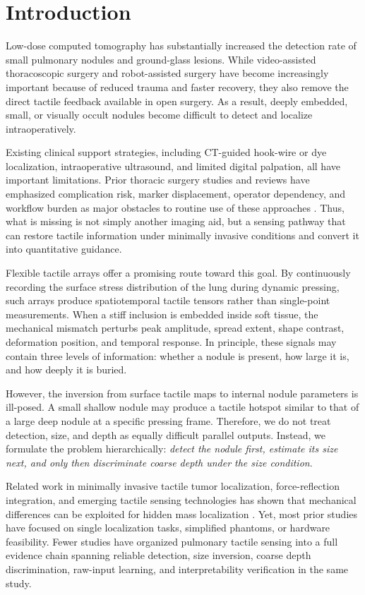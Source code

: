 \section{Introduction}

Low-dose computed tomography has substantially increased the detection rate of small pulmonary nodules and ground-glass lesions. While video-assisted thoracoscopic surgery and robot-assisted surgery have become increasingly important because of reduced trauma and faster recovery, they also remove the direct tactile feedback available in open surgery. As a result, deeply embedded, small, or visually occult nodules become difficult to detect and localize intraoperatively.

Existing clinical support strategies, including CT-guided hook-wire or dye localization, intraoperative ultrasound, and limited digital palpation, all have important limitations. Prior thoracic surgery studies and reviews have emphasized complication risk, marker displacement, operator dependency, and workflow burden as major obstacles to routine use of these approaches \cite{khereba2018preoperative,tang2022intraoperative,wang2025anchored}. Thus, what is missing is not simply another imaging aid, but a sensing pathway that can restore tactile information under minimally invasive conditions and convert it into quantitative guidance.

Flexible tactile arrays offer a promising route toward this goal. By continuously recording the surface stress distribution of the lung during dynamic pressing, such arrays produce spatiotemporal tactile tensors rather than single-point measurements. When a stiff inclusion is embedded inside soft tissue, the mechanical mismatch perturbs peak amplitude, spread extent, shape contrast, deformation position, and temporal response. In principle, these signals may contain three levels of information: whether a nodule is present, how large it is, and how deeply it is buried.

However, the inversion from surface tactile maps to internal nodule parameters is ill-posed. A small shallow nodule may produce a tactile hotspot similar to that of a large deep nodule at a specific pressing frame. Therefore, we do not treat detection, size, and depth as equally difficult parallel outputs. Instead, we formulate the problem hierarchically: \emph{detect the nodule first, estimate its size next, and only then discriminate coarse depth under the size condition}.

Related work in minimally invasive tactile tumor localization, force-reflection integration, and emerging tactile sensing technologies has shown that mechanical differences can be exploited for hidden mass localization \cite{perri2009robot,trejos2013integration,ly2025acoustic,huang2020tactile,bewley2022tactile}. Yet, most prior studies have focused on single localization tasks, simplified phantoms, or hardware feasibility. Fewer studies have organized pulmonary tactile sensing into a full evidence chain spanning reliable detection, size inversion, coarse depth discrimination, raw-input learning, and interpretability verification in the same study.

